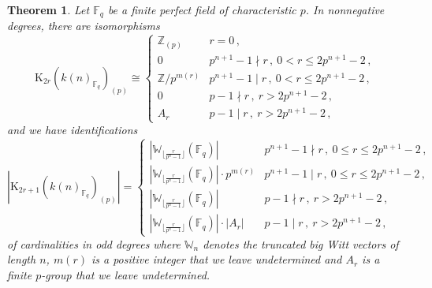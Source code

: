 \documentclass[english,10pt]{amsart}
\newcommand{\field}{\mathbb{F}}
\newtheorem{thm}{Theorem}[section]
\theoremstyle{definition}
\numberwithin{equation}{section}
\begin{document}
\begin{thm}\label{p-local-thm}
Let $\mathbb{F}_q$ be a finite perfect field of characteristic $p$. In nonnegative degrees, there are isomorphisms 
\[ 
\mathrm{K}_{2r}(k(n)_{\field_q
})_{(p)}\cong \begin{cases} \mathbb{Z}_{(p)} & r=0 \,,\\ 
    0  &  p^{n+1}-1\nmid r\,, \ 0<r\leq 2p^{n+1}-2  \,,\\
          \mathbb{Z}/p^{m(r)} &  p^{n+1}-1\mid r\,, \ 0<r\le 2p^{n+1}-2  \,, \\
    0 & p-1 \nmid r\,, \ r> 2p^{n+1}-2 \,, \\
     A_{r}  &  p-1\mid r\,, \ r> 2p^{n+1}-2  \,,
     \end{cases}
\]
and we have identifications 
\[ 
|\mathrm{K}_{2r+1}(k(n)_{\field_q})_{(p)}|=\begin{cases}
         
            |\mathbb{W}_{\lfloor \frac{r}{p^{n}-1}\rfloor}(\field_q)| & p^{n+1}-1\nmid r \,, \ 0\le r\le 2p^{n+1}-2 \,,\\
               |\mathbb{W}_{\lfloor \frac{r}{p^{n}-1}\rfloor}(\field_q)|\cdot p^{m(r)} & p^{n+1}-1\mid r \,, \ 0\le r\le  2p^{n+1}-2 \,, \\
         |\mathbb{W}_{\lfloor \frac{r}{p^{n}-1}\rfloor}(\field_q)| & p-1\nmid r \,, \ r > 2p^{n+1}-2 \,,\\
    |\mathbb{W}_{\lfloor \frac{r}{p^{n}-1}\rfloor}(\field_q)|\cdot \lvert A_r\rvert 
    & p-1\mid r\,, \ r>2p^{n+1}-2 \,, 
\end{cases}
\]
of cardinalities in odd degrees where $\mathbb{W}_n$ denotes the truncated big Witt vectors of length $n$, $m(r)$ is a positive integer that we leave undetermined and $A_{r}$ is a finite $p$-group that we leave undetermined. 
\end{thm}
\end{document}
